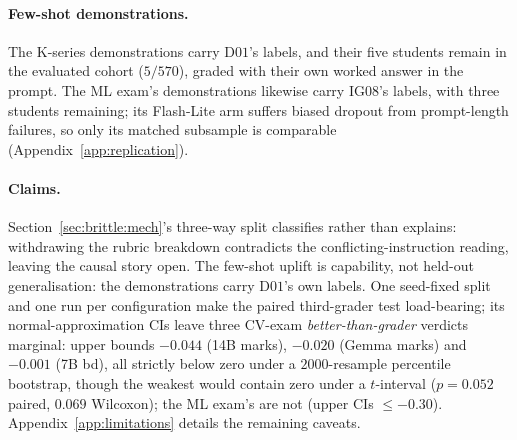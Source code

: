 \paragraph{Few-shot demonstrations.}
The K-series demonstrations carry D$01$'s labels, and their five students remain in the evaluated cohort ($5/570$), graded with their own worked answer in the prompt. The ML exam's demonstrations likewise carry IG$08$'s labels, with three students remaining; its Flash-Lite arm suffers biased dropout from prompt-length failures, so only its matched subsample is comparable (Appendix~\ref{app:replication}).

\paragraph{Claims.}
Section~\ref{sec:brittle:mech}'s three-way split classifies rather than explains: withdrawing the rubric breakdown contradicts the conflicting-instruction reading, leaving the causal story open. The few-shot uplift is capability, not held-out generalisation: the demonstrations carry D$01$'s own labels. One seed-fixed split and one run per configuration make the paired third-grader test load-bearing; its normal-approximation CIs leave three CV-exam \emph{better-than-grader} verdicts marginal: upper bounds $-0.044$ (14B marks), $-0.020$ (Gemma marks) and $-0.001$ (7B bd), all strictly below zero under a $2000$-resample percentile bootstrap, though the weakest would contain zero under a $t$-interval ($p = 0.052$ paired, $0.069$ Wilcoxon); the ML exam's are not (upper CIs $\le -0.30$). Appendix~\ref{app:limitations} details the remaining caveats.

